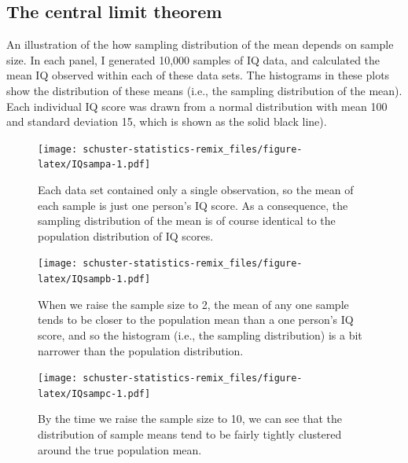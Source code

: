 \documentclass[
]{book}
\begin{document}
\hypertarget{clt}{%
\subsection{The central limit theorem}\label{clt}}

An illustration of the how sampling distribution of the mean depends on sample size. In each panel, I generated 10,000 samples of IQ data, and calculated the mean IQ observed within each of these data sets. The histograms in these plots show the distribution of these means (i.e., the sampling distribution of the mean). Each individual IQ score was drawn from a normal distribution with mean 100 and standard deviation 15, which is shown as the solid black line).

\begin{figure}
\centering
\texttt{[image: schuster-statistics-remix\_files/figure-latex/IQsampa-1.pdf]}
\caption{\label{fig:IQsampa}Each data set contained only a single observation, so the mean of each sample is just one person's IQ score. As a consequence, the sampling distribution of the mean is of course identical to the population distribution of IQ scores.}
\end{figure}

\begin{figure}
\centering
\texttt{[image: schuster-statistics-remix\_files/figure-latex/IQsampb-1.pdf]}
\caption{\label{fig:IQsampb}When we raise the sample size to 2, the mean of any one sample tends to be closer to the population mean than a one person's IQ score, and so the histogram (i.e., the sampling distribution) is a bit narrower than the population distribution.}
\end{figure}

\begin{figure}
\centering
\texttt{[image: schuster-statistics-remix\_files/figure-latex/IQsampc-1.pdf]}
\caption{\label{fig:IQsampc}By the time we raise the sample size to 10, we can see that the distribution of sample means tend to be fairly tightly clustered around the true population mean.}
\end{figure}
\end{document}
